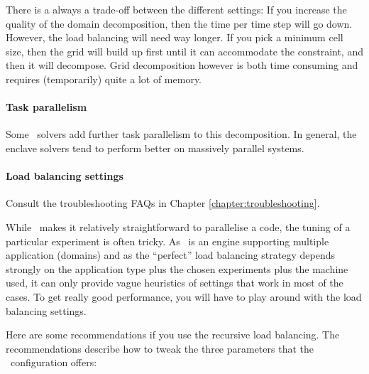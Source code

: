 \begin{remark}
 There is a always a trade-off between the different settings: 
 If you increase the quality of the domain decomposition, then the time per time step will go down.
 However, the load balancing will need way longer. 
 If you pick a minimum cell size, then the grid will build up first until it can accommodate the constraint, and then it will decompose.
 Grid decomposition however is both time consuming and requires (temporarily) quite a lot of memory.
\end{remark}   
 



\paragraph{Task parallelism}

Some \ExaHyPE\ solvers add further task parallelism to this decomposition. 
In general, the enclave solvers tend to perform better on massively parallel
systems.



\paragraph{Load balancing settings}

\begin{remark}
 Consult the troubleshooting FAQs in Chapter \ref{chapter:troubleshooting}.
\end{remark}

\noindent
While \ExaHyPE\ makes it relatively straightforward to parallelise a code, 
the tuning of a particular experiment is often tricky.
As \ExaHyPE\ is an engine supporting multiple application (domains) and as the
``perfect'' load balancing strategy depends strongly on the application type
plus the chosen experiments plus the machine used, it can only provide vague
heuristics of settings that work in most of the cases. 
To get really good performance, you will have to play around with the load
balancing settings.


Here are some recommendations if you use the recursive load balancing.
The recommendations describe how to tweak the three parameters that the
\ExaHyPE\ configuration offers:


